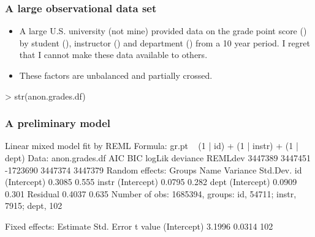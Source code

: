 \begin{frame}[fragile]\frametitle{A large observational data set}
  \begin{itemize}
  \item A large U.S. university (not mine) provided data on the grade
    point score () by student (), instructor
    () and department () from a 10 year period.
    I regret that I cannot make these data available to others.
  \item These factors are unbalanced and partially crossed.
  \end{itemize}
\begin{Schunk}
\begin{Sinput}
> str(anon.grades.df)
\end{Sinput}
\end{Schunk}%
\end{frame}

\begin{frame}[fragile]\frametitle{A preliminary model}
\begin{Schunk}
\begin{Soutput}
Linear mixed model fit by REML 
Formula: gr.pt ~ (1 | id) + (1 | instr) + (1 | dept) 
   Data: anon.grades.df 
     AIC     BIC   logLik deviance REMLdev
 3447389 3447451 -1723690  3447374 3447379
Random effects:
 Groups   Name        Variance Std.Dev.
 id       (Intercept) 0.3085   0.555   
 instr    (Intercept) 0.0795   0.282   
 dept     (Intercept) 0.0909   0.301   
 Residual             0.4037   0.635   
Number of obs: 1685394, groups: id, 54711; instr, 7915; dept, 102

Fixed effects:
            Estimate Std. Error t value
(Intercept)   3.1996     0.0314     102
\end{Soutput}
\end{Schunk}
\end{frame}

